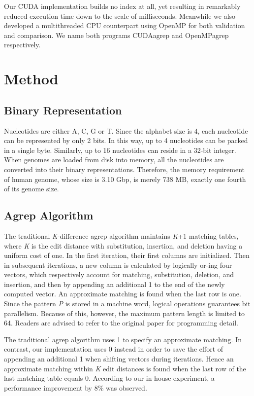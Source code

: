 Our CUDA implementation builds no index at all, yet resulting in remarkably reduced execution time down to the scale of milliseconds. Meanwhile we also developed a multithreaded CPU counterpart using OpenMP for both validation and comparison. We name both programs CUDAagrep and OpenMPagrep respectively.

\section{Method}

\subsection{Binary Representation}

Nucleotides are either A, C, G or T. Since the alphabet size is 4, each nucleotide can be represented by only 2 bits. In this way, up to 4 nucleotides can be packed in a single byte. Similarly, up to 16 nucleotides can reside in a 32-bit integer. When genomes are loaded from disk into memory, all the nucleotides are converted into their binary representations. Therefore, the memory requirement of human genome, whose size is 3.10 Gbp, is merely 738 MB, exactly one fourth of its genome size.

\subsection{Agrep Algorithm}

The traditional \textit{K}-difference agrep algorithm maintains \textit{K}+1 matching tables, where \textit{K} is the edit distance with substitution, insertion, and deletion having a uniform cost of one. In the first iteration, their first columns are initialized. Then in subsequent iterations, a new column is calculated by logically or-ing four vectors, which respectively account for matching, substitution, deletion, and insertion, and then by appending an additional 1 to the end of the newly computed vector. An approximate matching is found when the last row is one. Since the pattern \textit{P} is stored in a machine word, logical operations guarantees bit parallelism. Because of this, however, the maximum pattern length is limited to 64. Readers are advised to refer to the original paper \citep{190-1992,451-1992} for programming detail.

The traditional agrep algorithm uses 1 to specify an approximate matching. In contrast, our implementation uses 0 instead in order to save the effort of appending an additional 1 when shifting vectors during iterations. Hence an approximate matching within \textit{K} edit distances is found when the last row of the last matching table equals 0. According to our in-house experiment, a performance improvement by 8\% was observed.

